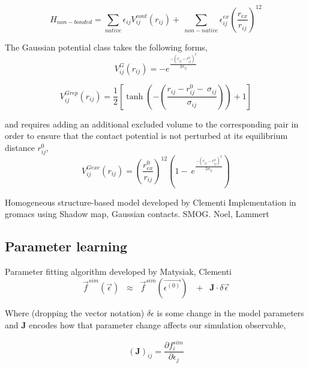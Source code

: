 \documentclass[preprint]{elsarticle}
\begin{document}
\begin{equation}
    H_{non-bonded} = \sum\limits_{native} \epsilon_{ij} V^{cont}_{ij}(r_{ij}) + \
        \sum\limits_{non-native} \epsilon^{ex}_{ij}\left(\frac{r_{ex}}{r_{ij}}\right)^{12}
\end{equation}

    The Gaussian potential class takes the following forms,
\begin{equation}
    V^{G}_{ij}(r_{ij}) = - e^{\frac{-(r_{ij} - r_{ij}^0)^2}{2\sigma_{ij}}}
\end{equation}

\begin{equation}
    V^{Grep}_{ij}(r_{ij}) = \frac{1}{2}\left[ \tanh\left(-\left(\frac{r_{ij} - r_{ij}^0 -\
                                \sigma_{ij}}{\sigma_{ij}}\right)\right) + 1 \right]
\end{equation}

and requires adding an additional excluded volume to the corresponding pair in
order to ensure that the contact potential is not perturbed at its equilibrium
distance $r_{ij}^0$,
\begin{equation}
    V^{Gexc}_{ij}(r_{ij}) = \left(\frac{r_{ex}^0}{r_{ij}}\right)^{12}\left(1 - \
                    e^{\frac{-(r_{ij} - r_{ij}^0)^2}{2\sigma_{ij}}}\right)
\end{equation}

Homogeneous structure-based model developed by Clementi 
Implementation in gromacs using Shadow map, Gaussian contacts. SMOG. Noel, Lammert


\subsection{Parameter learning}



Parameter fitting algorithm developed by Matysiak, Clementi
\begin{equation}
\label{eq:TaylorExp}
    \vec{f}^{sim}(\vec\epsilon) \;\;\approx \;\;\vec{f}^{sim}(\vec{\epsilon^{(0)}})\
                                \;\;+\;\;\bm{J}\cdot\delta\vec\epsilon 
\end{equation}

    Where (dropping the vector notation) $\delta\epsilon$ is some change in the
model parameters and $\bm{J}$ encodes how that parameter change affects our
simulation observable,

\begin{equation}
    \left(\bm{J}\right)_{ij} = \frac{\partial f^{sim}_i}{\partial\epsilon_j} 
\end{equation}
\end{document}
